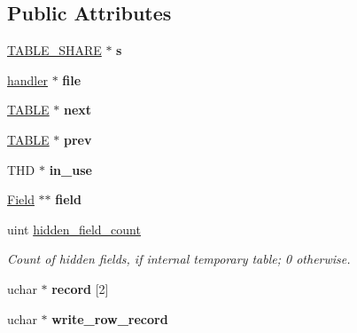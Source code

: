 \subsection*{Public Attributes}
\begin{DoxyCompactItemize}
\item 
\mbox{\label{structTABLE_aebc263efffc909babcfb7671ed0fbd1a}} 
\mbox{\hyperlink{structTABLE__SHARE}{T\+A\+B\+L\+E\+\_\+\+S\+H\+A\+RE}} $\ast$ {\bfseries s}
\item 
\mbox{\label{structTABLE_acb38f481e70f825c5e79f504e6b35212}} 
\mbox{\hyperlink{classhandler}{handler}} $\ast$ {\bfseries file}
\item 
\mbox{\label{structTABLE_a8a37d60b9f88048f2067d405c253428c}} 
\mbox{\hyperlink{structTABLE}{T\+A\+B\+LE}} $\ast$ {\bfseries next}
\item 
\mbox{\label{structTABLE_aeaa65b004e9cb541da5c68f39bbe3bdd}} 
\mbox{\hyperlink{structTABLE}{T\+A\+B\+LE}} $\ast$ {\bfseries prev}
\item 
\mbox{\label{structTABLE_a3f1c3c41eb5fe8126653e5b70547637a}} 
T\+HD $\ast$ {\bfseries in\+\_\+use}
\item 
\mbox{\label{structTABLE_aa411e95b12f6f74f19d192530a61a465}} 
\mbox{\hyperlink{classField}{Field}} $\ast$$\ast$ {\bfseries field}
\item 
\mbox{\label{structTABLE_aaa53929163870759d60694cb14319a01}} 
uint \mbox{\hyperlink{structTABLE_aaa53929163870759d60694cb14319a01}{hidden\+\_\+field\+\_\+count}}
\begin{DoxyCompactList}\small\item\em Count of hidden fields, if internal temporary table; 0 otherwise. \end{DoxyCompactList}\item 
\mbox{\label{structTABLE_a61135ed7b23c1394052d8c587e5b644f}} 
uchar $\ast$ {\bfseries record} \mbox{[}2\mbox{]}
\item 
\mbox{\label{structTABLE_ad9092c85b0f239731896652c7db12436}} 
uchar $\ast$ {\bfseries write\+\_\+row\+\_\+record}
$$
\end{DoxyCompactItemize}
